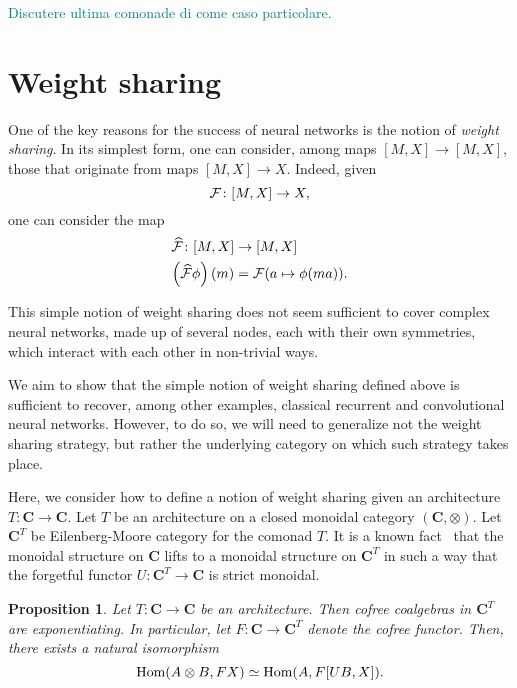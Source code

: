 \documentclass[12pt]{article}
\newtheorem{proposition}{Proposition}
\newcommand{\pietro}[1]{\textcolor{teal}{#1}}
\newcommand{\Hom}{{\textnormal{Hom}}}
\newcommand{\Cat}{{\mathbf{C}}}
\begin{document}
\pietro{Discutere ultima comonade di \cite{uustalu_comonadic_2008} come caso particolare.}

\section{Weight sharing}

One of the key reasons for the success of neural networks is the notion of {\em weight sharing}. In its simplest form, one can consider, among maps $[M, X] \rightarrow [M, X]$, those that originate from maps $[M, X] \rightarrow X$. Indeed, given
\begin{equation*}
    {\cal F} \colon [M, X] \rightarrow X,
\end{equation*}
one can consider the map
\begin{align*}
    \widehat{\cal F} \colon [M, X] &\rightarrow [M, X] \\
    \left(\widehat{\cal F}\phi\right)(m) &= {\cal F}(a \mapsto \phi(ma)).
\end{align*}

This simple notion of weight sharing does not seem sufficient to cover complex neural networks, made up of several nodes, each with their own symmetries, which interact with each other in non-trivial ways.

We aim to show that the simple notion of weight sharing defined above is sufficient to recover, among other examples, classical recurrent and convolutional neural networks. However, to do so, we will need to generalize not the weight sharing strategy, but rather the underlying category on which such strategy takes place.

Here, we consider how to define a notion of weight sharing given an architecture $T\colon\Cat \rightarrow \Cat$. Let $T$ be an architecture on a closed monoidal category $(\Cat, \otimes)$. Let $\Cat^T$ be Eilenberg-Moore category for the comonad $T$. It is a known fact~\cite{Moerdijk_2002,pastro2009closed} that the monoidal structure on $\Cat$ lifts to a monoidal structure on $\Cat^T$ in such a way that the forgetful functor $U\colon \Cat^T \rightarrow \Cat$ is strict monoidal.

\begin{proposition}\label{prop:cofree_exponentiating}
    Let $T\colon \Cat \rightarrow \Cat$ be an architecture. Then cofree coalgebras in $\Cat^T$ are exponentiating. In particular, let $F\colon \Cat \rightarrow \Cat^T$ denote the cofree functor. Then, there exists a natural isomorphism
    \begin{equation*}
        \Hom(A\otimes B, FX) \simeq \Hom(A, F[UB, X]).
    \end{equation*}
\end{proposition}
\end{document}
